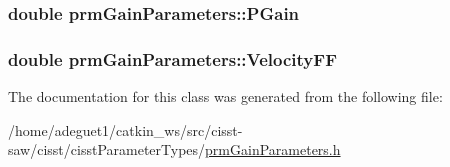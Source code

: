 \hypertarget{classprm_gain_parameters_a60f5eb4771e850faf09e1adc277a9212}{
\subsubsection[{P\-Gain}]{\setlength{\rightskip}{0pt plus 5cm}double prm\-Gain\-Parameters\-::\-P\-Gain}}\label{classprm_gain_parameters_a60f5eb4771e850faf09e1adc277a9212}
\hypertarget{classprm_gain_parameters_a331e5f1371acaf30e54f13e0e243aa0a}{
\subsubsection[{Velocity\-F\-F}]{\setlength{\rightskip}{0pt plus 5cm}double prm\-Gain\-Parameters\-::\-Velocity\-F\-F}}\label{classprm_gain_parameters_a331e5f1371acaf30e54f13e0e243aa0a}


The documentation for this class was generated from the following file\-:\begin{DoxyCompactItemize}
\item 
/home/adeguet1/catkin\-\_\-ws/src/cisst-\/saw/cisst/cisst\-Parameter\-Types/\hyperlink{prm_gain_parameters_8h}{prm\-Gain\-Parameters.\-h}\end{DoxyCompactItemize}
